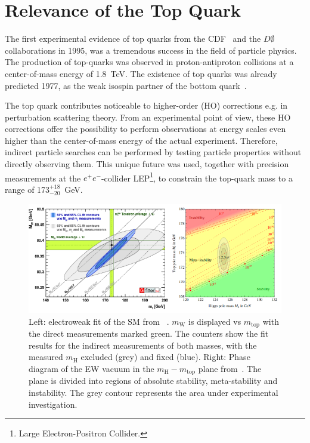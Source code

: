 \section{Relevance of the Top Quark}\label{Relevanz}

The first experimental evidence of top quarks from the CDF~\cite{Abe:1995hr} and the $D \emptyset$~\cite{Abachi:1995iq} collaborations in 1995, was a tremendous success in the field of particle physics. 
The production of top-quarks was observed in proton-antiproton collisions at a center-of-mass energy of 1.8~TeV. The existence of top quarks was already predicted 1977, as the weak isospin partner of the bottom quark~\cite{Herb:1977ek}. 

The top quark contributes noticeable to higher-order (HO) corrections e.g. in perturbation scattering theory.  From an experimental point of view, these HO corrections offer the possibility to perform observations at energy scales even higher than the center-of-mass energy of the actual experiment. Therefore, indirect particle searches can be performed by testing particle properties without directly observing them. This unique future was used, together with precision measurements at the $e^+e^-$-collider LEP\footnote{Large Electron-Positron Collider.}, to constrain the top-quark mass to a range of 173$^{+18}_{-20}$~GeV.~\cite{LEPEW:1994aa}
\begin{figure}[h]
	\centering
	\includegraphics[width=0.9\linewidth]{Pics/Relevanz}
	\caption{Left: electroweak fit of the SM from ~\cite{Baak:2012kk}. $m_{\text{W}}$ is displayed vs $m_{\text{top}}$ with the direct measurements marked green. The  counters show the fit results for the indirect measurements of both masses, with the measured $m_{\text{H}}$ excluded (grey) and fixed (blue).
		Right: Phase diagram of the EW vacuum in the $m_{\text{H}}-m_{\text{top}}$ plane from~\cite{Buttazzo:2013uya}. The plane is divided into regions of absolute stability, meta-stability and instability. The grey contour represents the area under experimental investigation.}
	\label{fig:Relevanz}
\end{figure}

